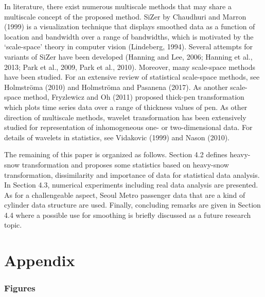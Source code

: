 \documentclass[preprint, review, 12pt]{article}
\theoremstyle{definition}
\theoremstyle{remark}
\begin{document}
In literature, there exist numerous multiscale methods that may share a multiscale concept of the proposed method. SiZer by Chaudhuri and Marron (1999) is a visualization technique that displays smoothed data as a function of location and bandwidth over a range of bandwidths, which is motivated by the `scale-space' theory in computer vision (Lindeberg, 1994). Several attempts for variants of SiZer have been developed (Hanning and Lee, 2006; Hanning et al., 2013; Park et al., 2009, Park et al., 2010). Moreover, many scale-space methods have been studied. For an extensive review of statistical scale-space methods, see Holmstr\"oma (2010) and Holmstr\"oma and Pasanena (2017). As another scale-space method, Fryzlewicz and Oh (2011) proposed thick-pen transformation which plots time series data over a range of thickness values of pen. As other direction of multiscale methods, wavelet transformation has been extensively studied for representation of inhomogeneous one- or two-dimensional data. For details of wavelets in statistics, see  Vidakovic (1999) and Nason (2010). 

The remaining of this paper is organized as follows. Section 4.2 defines heavy-snow transformation and proposes some statistics based on heavy-snow transformation, dissimilarity and importance of data for statistical data analysis. In Section 4.3, numerical experiments including real data analysis are presented. As for a challengeable aspect, Seoul Metro passenger data that are a kind of cylinder data structure are used. Finally, concluding remarks are given in Section 4.4 where a possible use for smoothing is briefly discussed as a future research topic. 
\fi 


\section*{Appendix}
\subsubsection*{Figures}
\end{document}
